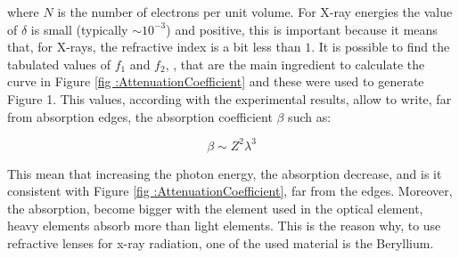 \begin{flushleft}
where $N $ is the number of electrons per unit volume. For X-ray energies the value of $\delta $ is small (typically $\sim 10^{-3} $) and positive, this is important because it means that, for X-rays, the refractive index is a bit less than $1 $. It is possible to find the tabulated values of $f_1 $ and $f_2 $, \cite{henke1981atomic}, that are the main ingredient to calculate the curve in Figure \ref{fig :AttenuationCoefficient}  and these were used to generate Figure 1. This values, according with the experimental results, allow to write, far from absorption edges, the absorption coefficient $\beta $ such as:
\end{flushleft}

\begin{equation}
\beta \sim Z^2 \lambda^3
\label{eq: new beta}
\end{equation}

\begin{flushleft}
This mean that increasing the photon energy, the absorption decrease, and is it consistent with Figure \ref{fig :AttenuationCoefficient}, far from the edges. Moreover, the absorption, become bigger with the element used in the optical element, heavy elements absorb more than light elements. This is the reason why, to use refractive lenses for x-ray radiation, one of the used material is the Beryllium.
\end{flushleft}


